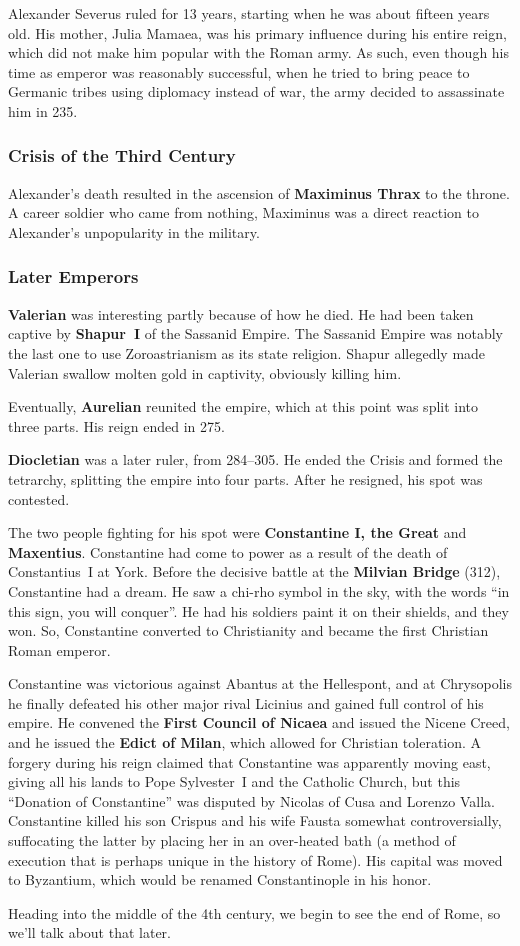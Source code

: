 Alexander Severus ruled for 13 years, starting when he was about fifteen years old.
His mother, Julia Mamaea, was his primary influence during his entire reign,
which did not make him popular with the Roman army.
As such, even though his time as emperor was reasonably successful,
when he tried to bring peace to Germanic tribes using diplomacy instead of war,
the army decided to assassinate him in 235.

\subsubsection*{Crisis of the Third Century}

Alexander's death resulted in the ascension of \textbf{Maximinus Thrax} to the throne.
A career soldier who came from nothing,
Maximinus was a direct reaction to Alexander's unpopularity in the military.

\subsubsection*{Later Emperors}

\textbf{Valerian} was interesting partly because of how he died.
He had been taken captive by \textbf{Shapur~I} of the Sassanid Empire.
The Sassanid Empire was notably the last one to use Zoroastrianism as its state religion.
Shapur allegedly made Valerian swallow molten gold in captivity, obviously killing him.

Eventually, \textbf{Aurelian} reunited the empire, which at this point was split into three parts.
His reign ended in 275.

\textbf{Diocletian} was a later ruler, from 284--305.
He ended the Crisis and formed the tetrarchy, splitting the empire into four parts.
After he resigned, his spot was contested.

The two people fighting for his spot were \textbf{Constantine I, the Great} and \textbf{Maxentius}.
Constantine had come to power as a result of the death of Constantius~I at York.
Before the decisive battle at the \textbf{Milvian Bridge} (312), Constantine had a dream.
He saw a chi-rho symbol in the sky, with the words ``in this sign, you will conquer''.
He had his soldiers paint it on their shields, and they won.
So, Constantine converted to Christianity and became the first Christian Roman emperor.

Constantine was victorious against Abantus at the Hellespont,
and at Chrysopolis he finally defeated his other major rival Licinius
and gained full control of his empire.
He convened the \textbf{First Council of Nicaea} and issued the Nicene Creed,
and he issued the \textbf{Edict of Milan}, which allowed for Christian toleration.
A forgery during his reign claimed that Constantine was apparently moving east,
giving all his lands to Pope Sylvester~I and the Catholic Church,
but this ``Donation of Constantine'' was disputed by Nicolas of Cusa and Lorenzo Valla.
Constantine killed his son Crispus and his wife Fausta somewhat controversially,
suffocating the latter by placing her in an over-heated bath
(a method of execution that is perhaps unique in the history of Rome).
His capital was moved to Byzantium, which would be renamed Constantinople in his honor.

Heading into the middle of the 4th century, we begin to see the end of Rome,
so we'll talk about that later.
